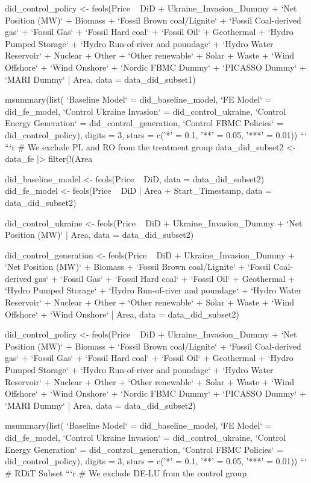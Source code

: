 did_control_policy <- feols(Price ~ DiD + Ukraine_Invasion_Dummy + `Net Position (MW)` + Biomass + `Fossil Brown coal/Lignite` + `Fossil Coal-derived gas` + `Fossil Gas` + `Fossil Hard coal` + `Fossil Oil` + Geothermal + `Hydro Pumped Storage` + `Hydro Run-of-river and poundage` + `Hydro Water Reservoir` + Nuclear + Other + `Other renewable` + Solar + Waste + `Wind Offshore` + `Wind Onshore` + `Nordic FBMC Dummy` + `PICASSO Dummy` + `MARI Dummy` | Area, data = data_did_subset1)

msummary(list(
    `Baseline Model` = did_baseline_model,
    `FE Model` = did_fe_model,
    `Control Ukraine Invasion` = did_control_ukraine,
    `Control Energy Generation` = did_control_generation,
    `Control FBMC Policies` = did_control_policy),
  digits = 3,
  stars = c('*' = 0.1, '**' = 0.05, '***' = 0.01))
```
```{r}
# We exclude PL and RO from the treatment group
data_did_subset2 <- data_fe |>
  filter(!(Area %

did_baseline_model <- feols(Price ~ DiD, data = data_did_subset2)
did_fe_model <- feols(Price ~ DiD | Area + Start_Timestamp, data = data_did_subset2)

did_control_ukraine <- feols(Price ~ DiD + Ukraine_Invasion_Dummy + `Net Position (MW)` | Area, data = data_did_subset2)

did_control_generation <- feols(Price ~ DiD + Ukraine_Invasion_Dummy + `Net Position (MW)` + Biomass + `Fossil Brown coal/Lignite` + `Fossil Coal-derived gas` + `Fossil Gas` + `Fossil Hard coal` + `Fossil Oil` + Geothermal + `Hydro Pumped Storage` + `Hydro Run-of-river and poundage` + `Hydro Water Reservoir` + Nuclear + Other + `Other renewable` + Solar + Waste + `Wind Offshore` + `Wind Onshore` | Area, data = data_did_subset2)

did_control_policy <- feols(Price ~ DiD + Ukraine_Invasion_Dummy + `Net Position (MW)` + Biomass + `Fossil Brown coal/Lignite` + `Fossil Coal-derived gas` + `Fossil Gas` + `Fossil Hard coal` + `Fossil Oil` + Geothermal + `Hydro Pumped Storage` + `Hydro Run-of-river and poundage` + `Hydro Water Reservoir` + Nuclear + Other + `Other renewable` + Solar + Waste + `Wind Offshore` + `Wind Onshore` + `Nordic FBMC Dummy` + `PICASSO Dummy` + `MARI Dummy` | Area, data = data_did_subset2)

msummary(list(
    `Baseline Model` = did_baseline_model,
    `FE Model` = did_fe_model,
    `Control Ukraine Invasion` = did_control_ukraine,
    `Control Energy Generation` = did_control_generation,
    `Control FBMC Policies` = did_control_policy),
  digits = 3,
  stars = c('*' = 0.1, '**' = 0.05, '***' = 0.01))
```
# RDiT Subset
```{r}
# We exclude DE-LU from the control group

